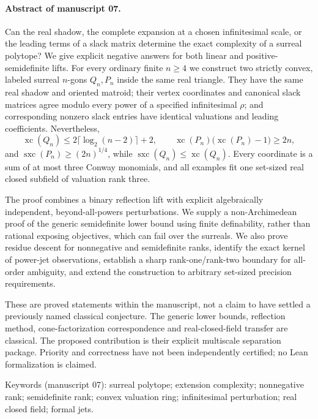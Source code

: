 \documentclass[11pt,a4paper]{article}
\numberwithin{equation}{section}
\theoremstyle{plain}
\newcommand{\xc}{\operatorname{xc}}
\newcommand{\sx}{\operatorname{sxc}}
\begin{document}
\paragraph{Abstract of manuscript 07.}
Can the real shadow, the complete expansion at a chosen infinitesimal scale,
or the leading terms of a slack matrix determine the exact complexity of a
surreal polytope? We give explicit negative answers for both linear and
positive-semidefinite lifts. For every ordinary finite $n\geq4$ we construct
two strictly convex, labeled surreal $n$-gons $Q_n,P_n$ inside the same real
triangle. They have the same real shadow and oriented matroid; their vertex
coordinates and canonical slack matrices agree modulo every power of a
specified infinitesimal $\rho$; and corresponding nonzero slack entries have
identical valuations and leading coefficients. Nevertheless,
\[
 \xc(Q_n)\leq 2\lceil\log_2(n-2)\rceil+2,
 \qquad \xc(P_n)\bigl(\xc(P_n)-1\bigr)\geq 2n,
\]
and $\sx(P_n)\geq(2n)^{1/4}$, while $\sx(Q_n)\leq\xc(Q_n)$.
Every coordinate is a sum of at most three Conway monomials, and all examples
fit one set-sized real closed subfield of valuation rank three.

The proof combines a binary reflection lift with explicit algebraically
independent, beyond-all-powers perturbations. We supply a non-Archimedean
proof of the generic semidefinite lower bound using finite definability,
rather than rational exposing objectives, which can fail over the surreals.
We also prove residue descent for nonnegative and semidefinite ranks,
identify the exact kernel of power-jet observations, establish a sharp
rank-one/rank-two boundary for all-order ambiguity, and extend the construction
to arbitrary set-sized precision requirements.

These are proved statements within the manuscript, not a claim to have
settled a previously named classical conjecture. The generic lower bounds,
reflection method, cone-factorization correspondence and real-closed-field
transfer are classical. The proposed contribution is their explicit
multiscale separation package. Priority and correctness have not been
independently certified; no Lean formalization is claimed.

{\small\color{ink}Keywords (manuscript 07): surreal polytope; extension complexity; nonnegative rank;
semidefinite rank; convex valuation ring; infinitesimal perturbation;
real closed field; formal jets.\par}
\end{document}
